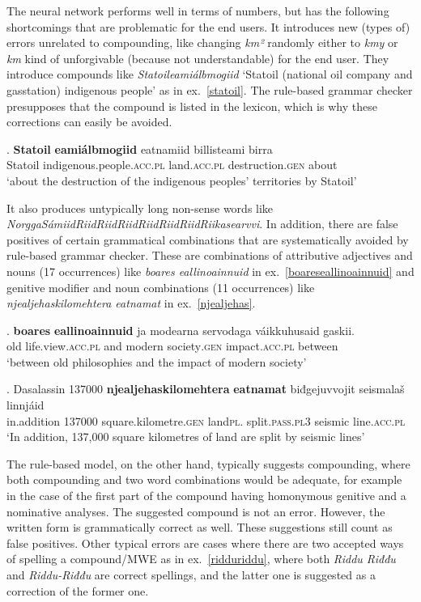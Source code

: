 \documentclass[postprint]{flammie}
\begin{document}
The neural network performs well in terms of numbers, but has the following
shortcomings that are  problematic for the end users.  It introduces new (types
of) errors unrelated to compounding, like changing \textit{km²} randomly either
to \textit{kmy} or \textit{km} kind of unforgivable (because not understandable)
for the end user.  They introduce compounds like \textit{Statoileamiálbmogiid}
`Statoil (national oil company and gasstation) indigenous people' as in
ex.~\ref{statoil}.  The rule-based grammar checker presupposes that the compound
is listed in the lexicon, which is why these corrections can easily be avoided.

\exg. \textbf{Statoil} \textbf{eamiálbmogiid} eatnamiid billisteami birra\label{statoil}\\
Statoil indigenous.people.\textsc{acc.pl} land.\textsc{acc.pl} destruction\textsc{.gen} about\\
`about the destruction of the indigenous peoples' territories by Statoil'


It also produces untypically long non-sense words like
\textit{NorggaSámiidRiidRiidRiidRiidRiidRiidRiikasearvvi}.  In addition, there
are false positives of certain grammatical combinations that are systematically
avoided by rule-based grammar checker.  These are combinations of attributive
adjectives and nouns (17 occurrences) like \textit{boares eallinoainnuid} in
ex.~\ref{boareseallinoainnuid} and genitive modifier and noun combinations (11
occurrences) like \textit{njealjehaskilomehtera eatnamat} in
ex.~\ref{njealjehas}.

\exg. \textbf{boares} \textbf{eallinoainnuid} ja modearna servodaga váikkuhusaid gaskii.\label{boareseallinoainnuid}\\
old life.view\textsc{.acc.pl} and modern society\textsc{.gen} impact\textsc{.acc.pl} between \\
`between old philosophies and the impact of modern society'

\exg. Dasalassin 137000 \textbf{njealjehaskilomehtera} \textbf{eatnamat} biđgejuvvojit seismalaš linnjáid\label{njealjehas}\\
in.addition 137000 square.kilometre\textsc{.gen} land\textsc{pl.} split\textsc{.pass.pl3} seismic line\textsc{.acc.pl} \\
`In addition, 137,000 square kilometres of land are split by seismic lines'


The rule-based model, on the other hand, typically suggests compounding, where
both compounding and two word combinations would be adequate, for example in the
case of the first part of the compound having homonymous genitive and a
nominative analyses. The suggested compound is not an error. However, the
written form is grammatically correct as well. These suggestions still count as
false positives. Other typical errors are cases where there are two accepted
ways of spelling a compound/MWE as in ex.~\ref{ridduriddu}, where both
\textit{Riddu Riđđu} and \textit{Riddu-Riđđu} are correct spellings, and the
latter one is suggested as a correction of the former one.
\end{document}
